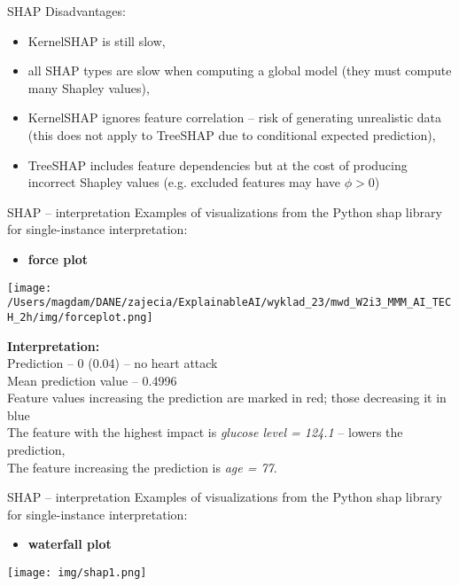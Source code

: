 \documentclass{beamer}
\newcommand{\eptfootnote}[1]{{%
  \let\thempfn\relax%
  \footnotetext[0]{\emph{#1}}%
}}
\begin{document}
\begin{frame}{SHAP}
Disadvantages:\\
\begin{itemize}
\item KernelSHAP is still slow,
\item all SHAP types are slow when computing a global model (they must compute many Shapley values),
\item KernelSHAP ignores feature correlation – risk of generating unrealistic data (this does not apply to TreeSHAP due to conditional expected prediction),
\item TreeSHAP includes feature dependencies but at the cost of producing incorrect Shapley values (e.g. excluded features may have $\phi > 0$)
\end{itemize}
\end{frame}

\begin{frame}{SHAP – interpretation}
Examples of visualizations from the Python shap library for single-instance interpretation:
\begin{itemize}
\item \textbf{force plot}
\end{itemize} 
\texttt{[image: /Users/magdam/DANE/zajecia/ExplainableAI/wyklad\_23/mwd\_W2i3\_MMM\_AI\_TECH\_2h/img/forceplot.png]} 

\textbf{Interpretation:}\\
Prediction – 0 (0.04) – no heart attack\\
Mean prediction value – 0.4996\\
Feature values increasing the prediction are marked in red; those decreasing it in blue\\
The feature with the highest impact is \textit{glucose level = 124.1} – lowers the prediction,\\
The feature increasing the prediction is \textit{age = 77}.
\end{frame}

\begin{frame}{SHAP – interpretation}
Examples of visualizations from the Python shap library for single-instance interpretation:
\begin{itemize}
\item \textbf{waterfall plot}
\end{itemize} 
\begin{center}
\texttt{[image: img/shap1.png]}  
\end{center}
\eptfootnote{\url{https://github.com/shap/shap}}
\end{frame}
\end{document}

